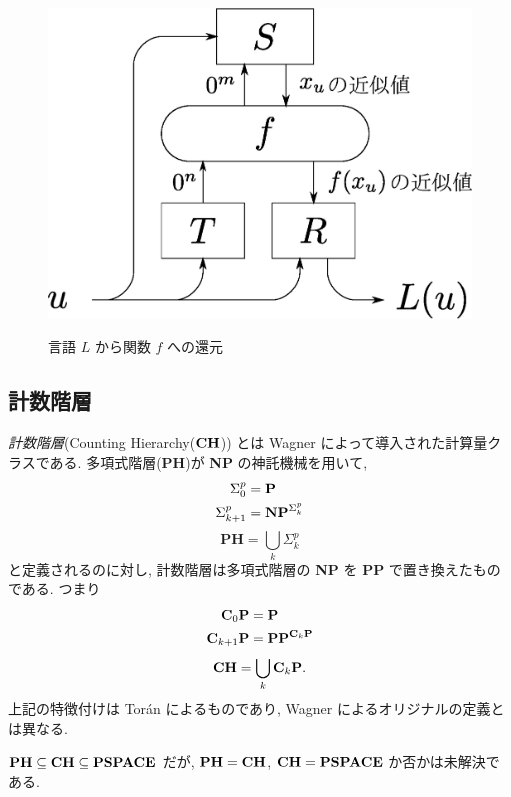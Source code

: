  \begin{figure}
  \begin{center}
  \label{fig:reduction}
  \includegraphics[scale=0.25]{image/reduction.eps}
  \caption{言語 $L$ から関数 $f$ への還元}
  \end{center}
 \end{figure}



\subsection{計数階層}

\emph{計数階層}(Counting Hierarchy($\mathbf{CH}$)) とは
Wagner によって導入された計算量クラスである\cite{wagner1986complexity}.
多項式階層({\bf PH})が {\bf NP} の神託機械を用いて,
\begin{align*}
 \Sigma^p_0 
 &= \mathbf{P} \\
 \Sigma^p_{k+1}
 &= \mathbf{NP}^{\Sigma^p_k}
\end{align*}
\[
 \mathbf{PH} = \bigcup_k \Sigma^p_k
\]
と定義されるのに対し,
計数階層は多項式階層の {\bf NP} を {\bf PP} で置き換えたものである. つまり
\begin{align*}
 \mathbf{C}_0 \mathbf{P}  
 &= \mathbf{P} \\
 \mathbf{C}_{k+1} \mathbf{P}
 &= \mathbf{PP}^{\mathbf{C}_k \mathbf{P}}
\end{align*}
\[
 \mathbf{CH} = \bigcup_k \mathbf{C}_k \mathbf{P}.
\]
上記の特徴付けは Tor{\'a}n によるものであり,
Wagner によるオリジナルの定義とは異なる\cite{toran1991complexity}.

$\mathbf{PH} \subseteq \mathbf{CH} \subseteq \mathbf{PSPACE}$ だが,
$\mathbf{PH} = \mathbf{CH}$, $\mathbf{CH} = \mathbf{PSPACE}$
か否かは未解決である.
